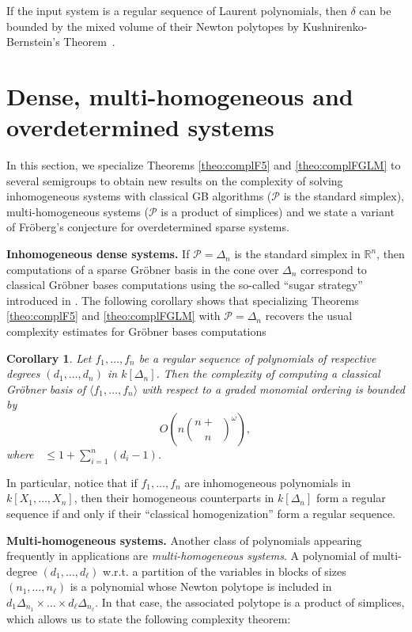 \documentclass[12pt]{article}
\numberwithin{equation}{section}
\numberwithin{theorem}{section}
\newtheorem{corollary}[theorem]{Corollary}
\newcommand{\polytope}{\mathscr P}
\DeclareMathOperator{\dwit}{d_{wit}}
\newcommand{\R}{\mathbb{R}}
\begin{document}
If the input system is a regular sequence of Laurent polynomials, then
$\delta$ can be bounded by the mixed volume of their Newton polytopes
by Kushnirenko-Bernstein's Theorem~\cite{bernshtein1975number}.


\section{Dense, multi-homogeneous and overdetermined systems}\label{sec:applis}
In this section, we specialize Theorems \ref{theo:complF5} and \ref{theo:complFGLM} to several semigroups to obtain new results on the complexity of solving inhomogeneous systems with classical GB algorithms ($\polytope$ is the standard simplex), multi-homogeneous systems ($\polytope$ is a product of simplices) and we state a variant of Fr\"oberg's conjecture for overdetermined sparse systems.

{\bf Inhomogeneous dense systems.}
If $\polytope=\Delta_n$ is the standard simplex in $\R^n$, then
computations of a sparse Gr\"obner basis in the cone over $\Delta_n$
correspond to classical Gr\"obner bases computations using the
so-called ``sugar strategy'' introduced in
\cite{giovini1991one}. The following corollary shows that specializing Theorems \ref{theo:complF5} and \ref{theo:complFGLM} with $\polytope=\Delta_n$ recovers the usual complexity estimates for Gr\"obner bases computations
\begin{corollary}
  Let $f_1,\ldots, f_n$ be a regular sequence of
  polynomials of respective degrees $(d_1,\ldots, d_n)$ in $k[\Delta_n]$. Then the complexity of computing a classical Gr\"obner basis
  of $\langle f_1,\ldots, f_n\rangle$ with respect to a graded
  monomial ordering is bounded by 
$$O\left(n\binom{n+\dwit}{n}^\omega\right),$$
where $\dwit\leq 1+\sum_{i=1}^n(d_i-1)$.
\end{corollary}
In particular, notice that if $f_1,\ldots, f_n$ are inhomogeneous
polynomials in $k[X_1,\ldots, X_n]$, then their homogeneous counterparts in
$k[\Delta_n]$ form a regular sequence if and only if their ``classical
homogenization'' form a regular sequence.

\smallskip

{\bf Multi-homogeneous systems.} Another class of polynomials appearing frequently in applications are \emph{multi-homo\-ge\-neous systems}. A polynomial of multi-degree $(d_1,\ldots, d_\ell)$ w.r.t. a partition of the variables in blocks of sizes $(n_1,\ldots, n_\ell)$ is a polynomial whose Newton polytope is included in $d_1\Delta_{n_1}\times\dots\times d_\ell\Delta_{n_\ell}$. In that case, the associated polytope is a product of simplices, which allows us to state the following complexity theorem:
\end{document}

